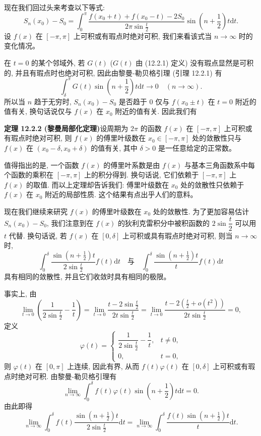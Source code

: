 \documentclass[UTF8, 12pt, fontset=fandol, oneside]{ctexart}
\begin{document}
现在我们回过头来考查以下等式:
\[
  S_n(x_0)-S_0
  =\int_0^\pi\frac{f(x_0+t)+f(x_0-t)-2S_0}{2\pi\sin\frac t2}
    \sin\left(n+\frac12\right)t\mathrm dt.
\]
设 $f(x)$ 在 $[-\pi,\pi]$ 上可积或有瑕点时绝对可积, 我们来看该式当 $n\to\infty$ 时的变化情况。

在 $t=0$ 的某个邻域外, 若 $G(t)$ ($G(t)$ 由 (12.2.1) 定义) 没有瑕点显然是可积的, 并且有瑕点时也绝对可积, 因此由黎曼-勒贝格引理 (引理 12.2.1) 有
\[
  \int_\delta^\pi G(t)\sin\left(n+\frac12\right)t\mathrm dt\to0
  \quad (n\to\infty).
\]
所以当 $n$ 趋于无穷时, $S_n(x_0)-S_0$ 是否趋于 $0$ 仅与 $f(x_0\pm t)$ 在 $t=0$ 附近的值有关, 换句话说仅与 $f(x)$ 在 $x_0$ 附近的值有关. 因此我们有

\noindent\textbf{定理 12.2.2 (黎曼局部化定理)}\quad 设周期为 $2\pi$ 的函数 $f(x)$ 在 $[-\pi,\pi]$ 上可积或有瑕点时绝对可积, 则 $f(x)$ 的傅里叶级数在 $x_0\in[-\pi,\pi]$ 处的敛散性只与 $f(x)$ 在 $(x_0-\delta,x_0+\delta)$ 的值有关, 其中 $\delta>0$ 是一任意给定的正常数。

值得指出的是, 一个函数 $f(x)$ 的傅里叶系数是由 $f(x)$ 与基本三角函数系中每个函数的乘积在 $[-\pi,\pi]$ 上的积分得到. 换句话说, 它们依赖于 $[-\pi,\pi]$ 上 $f(x)$ 的取值. 而以上定理却告诉我们: 傅里叶级数在 $x_0$ 处的敛散性只依赖于 $f(x)$ 在 $x_0$ 附近的局部性质. 这个结果有点出乎人们的意料。

现在我们继续来研究 $f(x)$ 的傅里叶级数在 $x_0$ 处的敛散性. 为了更加容易估计 $S_n(x_0)-S_0$, 我们注意到在 $f(x)$ 的狄利克雷积分中被积函数的 $2\sin\dfrac t2$ 可以用 $t$ 代替. 换句话说, 若 $f(x)$ 在 $[0,\delta]$ 上可积或具有瑕点时绝对可积, 则当 $n\to\infty$ 时,
\[
  \int_0^\delta\frac{\sin\left(n+\frac12\right)t}{2\sin\frac t2}f(t)\mathrm dt
  \quad\text{与}\quad
  \int_0^\delta\frac{\sin\left(n+\frac12\right)t}{t}f(t)\mathrm dt
\]
具有相同的敛散性, 并且它们收敛时具有相同的极限。

事实上, 由
\[
  \lim_{t\to0}\left(\frac1{2\sin\frac t2}-\frac1t\right)
  =\lim_{t\to0}\frac{t-2\sin\frac t2}{2t\sin\frac t2}
  =\lim_{t\to0}\frac{t-2\left(\frac t2+o(t^2)\right)}{2t\sin\frac t2}=0,
\]
定义
\[
  \varphi(t)=
  \begin{cases}
    \dfrac1{2\sin\frac t2}-\dfrac1t, & t\ne0,\\
    0, & t=0,
  \end{cases}
\]
则 $\varphi(t)$ 在 $[0,\pi]$ 上连续, 因此有界, 从而 $f(t)\varphi(t)$ 在 $[0,\delta]$ 上可积或有瑕点时绝对可积. 由黎曼-勒贝格引理有
\[
  \lim_{n\to\infty}\int_0^\delta f(t)\varphi(t)\sin\left(n+\frac12\right)t\mathrm dt=0.
\]
由此即得
\[
  \lim_{n\to\infty}\int_0^\delta f(t)\frac{\sin\left(n+\frac12\right)t}{2\sin\frac t2}\mathrm dt
  =
  \lim_{n\to\infty}\int_0^\delta\frac{f(t)\sin\left(n+\frac12\right)t}{t}\mathrm dt.
\]
\end{document}
